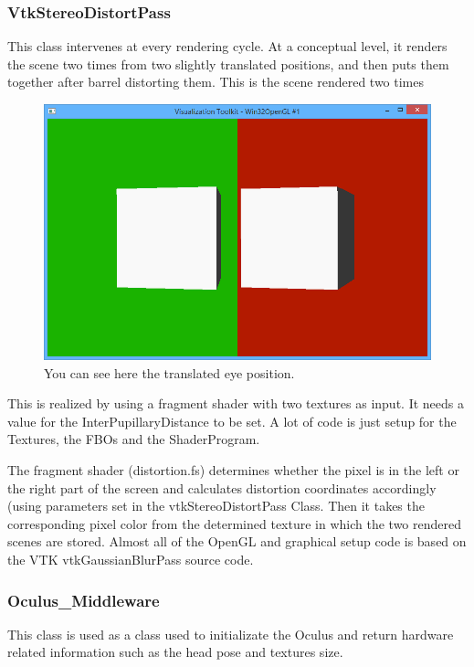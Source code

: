 \documentclass[11pt]{article} %
\begin{document}
%
\FloatBarrier
\pagebreak
\subsubsection{VtkStereoDistortPass}
This class intervenes at every rendering cycle. At a conceptual level, it renders the scene two times from two slightly translated positions, and then puts them together after barrel distorting them.
This is the scene rendered two times
\begin{figure}[h!]

\includegraphics[width=0.8\linewidth]{img/stereodistortpass_eyedistance.PNG}
  \caption{You can see here the translated eye position.}

\end{figure}


This is realized by using a fragment shader with two textures as input. It needs a value for the InterPupillaryDistance to be set. A lot of code is just setup for the Textures, the FBOs and the ShaderProgram.


The fragment shader (distortion.fs) determines whether the pixel is in the left or the right part of the screen and calculates distortion coordinates accordingly (using parameters set in the vtkStereoDistortPass Class. Then it takes the corresponding pixel color from the determined texture in which the two rendered scenes are stored.
Almost all of the OpenGL and graphical setup code is based on the VTK vtkGaussianBlurPass source code.

%

\FloatBarrier

\subsubsection{Oculus\_Middleware}
This class is used as a class used to initializate the Oculus and return hardware related information such as the head pose and textures size.
\end{document}
